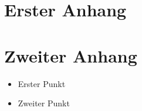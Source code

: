 \chapter{Erster Anhang}
\label{sec:erster_anhang}

\blindtext

\chapter{Zweiter Anhang}
\label{sec:zweiter_anhang}
\begin{itemize}
   	 \item{Erster Punkt}
   	 \item{Zweiter Punkt}
\end{itemize}